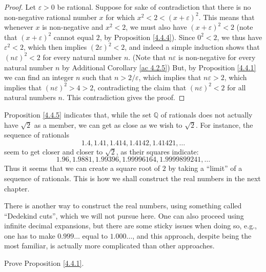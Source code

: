 \begin{proof}
Let \(\varepsilon > 0\) be rational.
Suppose for sake of contradiction that there is no non-negative rational number \(x\) for which \(x^2 < 2 < (x + \varepsilon)^2\).
This means that whenever \(x\) is non-negative and \(x^2 < 2\), we must also have \((x + \varepsilon)^2 < 2\)
(note that \((x + \varepsilon)^2\) cannot equal \(2\), by Proposition \ref{4.4.4}).
Since \(0^2 < 2\), we thus have \(\varepsilon^2 < 2\), which then implies \((2\varepsilon)^2 < 2\), and indeed a simple induction shows that \((n\varepsilon)^2 < 2\) for every natural number \(n\).
(Note that \(n\varepsilon\) is non-negative for every natural number \(n\) by Additional Corollary \ref{ac 4.2.5})
But, by Proposition \ref{4.4.1} we can find an integer \(n\) such that \(n > 2 / \varepsilon\), which implies that \(n\varepsilon > 2\), which implies that \((n\varepsilon)^2 > 4 > 2\), contradicting the claim that \((n\varepsilon)^2 < 2\) for all natural numbers \(n\).
This contradiction gives the proof.
\end{proof}

\begin{note}
Proposition \ref{4.4.5} indicates that, while the set \(\mathds{Q}\) of rationals does not actually have \(\sqrt{2}\) as a member, we can get as close as we wish to \(\sqrt{2}\).
For instance, the sequence of rationals
\[
    1.4, 1.41, 1.414, 1.4142, 1.41421, \dots
\]
seem to get closer and closer to \(\sqrt{2}\), as their squares indicate:
\[
    1.96, 1.9881, 1.99396, 1.99996164, 1.9999899241, \dots
\]
Thus it seems that we can create a square root of \(2\) by taking a ``limit'' of a sequence of rationals.
This is how we shall construct the real numbers in the next chapter.
\end{note}

\begin{note}
There is another way to construct the real numbers, using something called ``Dedekind cuts'', which we will not pursue here.
One can also proceed using infinite decimal expansions, but there are some sticky issues when doing so, e.g., one has to make \(0.999\dots\) equal to \(1.000\dots\), and this approach, despite being the most familiar, is actually more complicated than other approaches.
\end{note}

\exercisesection

\begin{exercise}\label{ex 4.4.1}
Prove Proposition \ref{4.4.1}.
\end{exercise}

